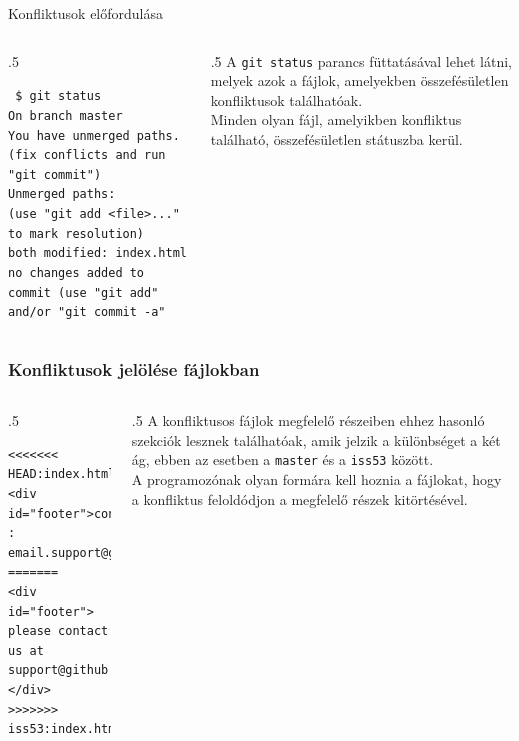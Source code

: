 \documentclass[english, aspectratio=169]{beamer}
\begin{document}
	\begin{frame}{Konfliktusok előfordulása}
		\begin{columns}
			\begin{column}{.5\textwidth}
				\begin{footnotesize}
					\begin{block}{}
						\texttt{
							\$ git status\\
							On branch master\\
							You have unmerged paths.\\
							(fix conflicts and run "git commit")\\
							Unmerged paths:\\
							(use "git add <file>..." to mark resolution)\\
							both modified: index.html\\
							no changes added to commit (use "git add" and/or "git commit -a"\\}
					\end{block}
				\end{footnotesize}
			\end{column}
			\begin{column}{.5\textwidth}
				A \texttt{git status} parancs füttatásával lehet látni, melyek azok a fájlok, amelyekben összefésületlen konfliktusok
				találhatóak.\\
				\vspace{0.2cm}
				Minden olyan fájl, amelyikben konfliktus található, összefésületlen státuszba kerül.
			\end{column}
		\end{columns}
	\end{frame}
	
	\begin{frame}[fragile]\frametitle{Konfliktusok jelölése fájlokban}
		\begin{columns}
			\begin{column}{.5\textwidth}
				\begin{footnotesize}
					\begin{block}{}
						\begin{verbatim}
<<<<<<< HEAD:index.html
<div id="footer">contact :
email.support@github.com</div>
=======
<div id="footer">
please contact us at support@github.com
</div>
>>>>>>> iss53:index.html
						\end{verbatim}
					\end{block}
				\end{footnotesize}
			\end{column}
			\begin{column}{.5\textwidth}
				A konfliktusos fájlok megfelelő részeiben ehhez hasonló szekciók lesznek találhatóak, amik jelzik a különbséget a két ág, ebben az esetben a \texttt{master} és a \texttt{iss53} között.\\
				\vspace{0.2cm}
				A programozónak olyan formára kell hoznia a fájlokat, hogy a konfliktus feloldódjon a megfelelő részek kitörtésével.
			\end{column}
		\end{columns}
	\end{frame}
	
\end{document}
